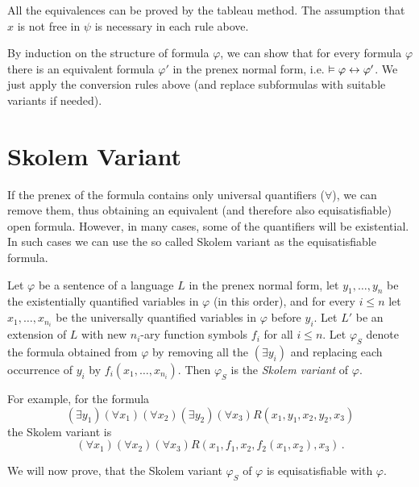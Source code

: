 All the equivalences can be proved by the tableau method. The assumption that $x$ is not free in $\psi$ is necessary in each rule above. 

By induction on the structure of formula $\varphi$, we can show that for every formula $\varphi$ there is an equivalent formula $\varphi'$ in the prenex normal form, i.e. $\vDash \varphi \leftrightarrow \varphi'$. We just apply the conversion rules above (and replace subformulas with suitable variants if needed). 

\section{Skolem Variant}

If the prenex of the formula contains only universal quantifiers ($\forall$), we can remove them, thus obtaining an equivalent (and therefore also equisatisfiable) open formula. However, in many cases, some of the quantifiers will be existential. In such cases we can use the so called Skolem variant as the equisatisfiable formula.

Let $\varphi$ be a sentence of a language $L$ in the prenex normal form, let $y_1, \dots, y_n$ be the existentially quantified variables in $\varphi$ (in this order), and for every $i \leq n$ let $x_1, \dots, x_{n_i}$ be the universally quantified variables in $\varphi$ before $y_i$. Let $L'$ be an extension of $L$ with new $n_i$-ary function symbols $f_i$ for all $i \leq n$. Let $\varphi_S$ denote the formula obtained from $\varphi$ by removing all the $(\exists y_i)$ and replacing each occurrence of $y_i$ by $f_i(x_1, \dots, x_{n_i})$. Then $\varphi_S$ is the \emph{Skolem variant} of $\varphi$.

For example, for the formula $$(\exists y_1)(\forall x_1)(\forall x_2)(\exists y_2)(\forall x_3)R(x_1, y_1, x_2, y_2, x_3)$$ the Skolem variant is $$(\forall x_1)(\forall x_2)(\forall x_3)R(x_1, f_1, x_2, f_2(x_1, x_2), x_3)\,.$$ 


We will now prove, that the Skolem variant $\varphi_S$ of $\varphi$ is equisatisfiable with $\varphi$. 

